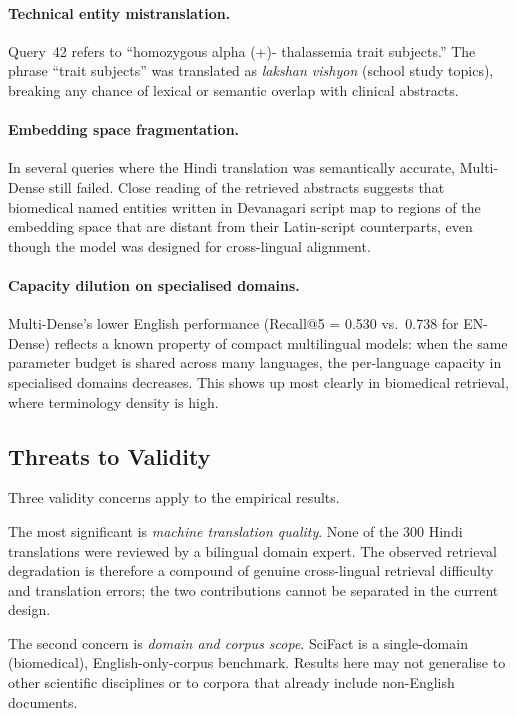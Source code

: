 \documentclass[acmsmall,screen,review]{acmart}
\begin{document}
\paragraph{Technical entity mistranslation.}
Query~42 refers to ``homozygous alpha (+)- thalassemia trait subjects.''
The phrase ``trait subjects'' was translated as \emph{lakshan vishyon}
(school study topics), breaking any chance of lexical or semantic overlap
with clinical abstracts.

\paragraph{Embedding space fragmentation.}
In several queries where the Hindi translation was semantically accurate,
Multi-Dense still failed.  Close reading of the retrieved abstracts
suggests that biomedical named entities written in Devanagari script map
to regions of the embedding space that are distant from their Latin-script
counterparts, even though the model was designed for cross-lingual
alignment.

\paragraph{Capacity dilution on specialised domains.}
Multi-Dense's lower English performance (Recall@5 = 0.530 vs.\ 0.738 for
EN-Dense) reflects a known property of compact multilingual models: when
the same parameter budget is shared across many languages, the per-language
capacity in specialised domains decreases.  This shows up most clearly
in biomedical retrieval, where terminology density is high.

\subsection{Threats to Validity}
\label{sec:threats}

Three validity concerns apply to the empirical results.

The most significant is \emph{machine translation quality}.  None of the
300 Hindi translations were reviewed by a bilingual domain expert.  The
observed retrieval degradation is therefore a compound of genuine
cross-lingual retrieval difficulty and translation errors; the two
contributions cannot be separated in the current design.

The second concern is \emph{domain and corpus scope}.  SciFact is a
single-domain (biomedical), English-only-corpus benchmark.  Results here
may not generalise to other scientific disciplines or to corpora that
already include non-English documents.
\end{document}
